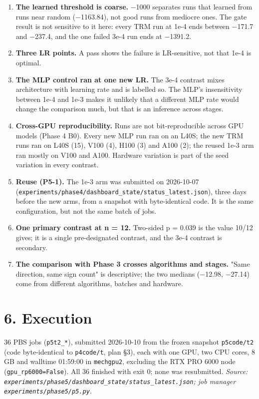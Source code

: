 \documentclass[11pt]{article}
\begin{document}
\begin{enumerate}
\item \textbf{The learned threshold is coarse.} $-$1000 separates runs that learned from runs near random ($-$1163.84), not good runs from mediocre ones. The gate result is not sensitive to it here: every TRM run at 1e-4 ends between $-$171.7 and $-$237.4, and the one failed 3e-4 run ends at $-$1391.2.
\item \textbf{Three LR points.} A pass shows the failure is LR-sensitive, not that 1e-4 is optimal.
\item \textbf{The MLP control ran at one new LR.} The 3e-4 contrast mixes architecture with learning rate and is labelled so. The MLP's insensitivity between 1e-4 and 1e-3 makes it unlikely that a different MLP rate would change the comparison much, but that is an inference across stages.
\item \textbf{Cross-GPU reproducibility.} Runs are not bit-reproducible across GPU models (Phase 4 B0). Every new MLP run ran on an L40S; the new TRM runs ran on L40S (15), V100 (4), H100 (3) and A100 (2); the reused 1e-3 arm ran mostly on V100 and A100. Hardware variation is part of the seed variation in every contrast.
\item \textbf{Reuse (P5-1).} The 1e-3 arm was submitted on 2026-10-07 (\texttt{experiments/\allowbreak{}phase4/\allowbreak{}dashboard\_\allowbreak{}state/\allowbreak{}status\_\allowbreak{}latest.\allowbreak{}json}), three days before the new arms, from a snapshot with byte-identical code. It is the same configuration, but not the same batch of jobs.
\item \textbf{One primary contrast at n = 12.} Two-sided p = 0.039 is the value 10/12 gives; it is a single pre-designated contrast, and the 3e-4 contrast is secondary.
\item \textbf{The comparison with Phase 3 crosses algorithms and stages.} "Same direction, same sign count" is descriptive; the two medians ($-$12.98, $-$27.14) come from different algorithms, batches and hardware.
\end{enumerate}



\section*{6. Execution}



36 PBS jobs (\texttt{p5t2\_*}), submitted 2026-10-10 from the frozen snapshot \texttt{p5code/t2} (code byte-identical to \texttt{p4code/t}, plan \S{}3), each with one GPU, two CPU cores, 8 GB and walltime 01:59:00 in \texttt{mechgpu2}, excluding the RTX PRO 6000 node (\texttt{gpu\_\allowbreak{}rp6000=False}). All 36 finished with exit 0; none was resubmitted. \emph{Source: \texttt{experiments/\allowbreak{}phase5/\allowbreak{}dashboard\_\allowbreak{}state/\allowbreak{}status\_\allowbreak{}latest.\allowbreak{}json}; job manager \texttt{experiments/\allowbreak{}phase5/\allowbreak{}p5.\allowbreak{}py}.}
\end{document}
